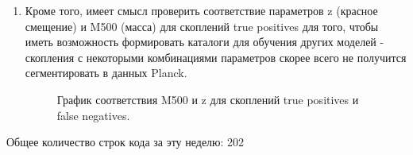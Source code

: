 \documentclass{article}
\begin{document}
\begin{enumerate}
    \item Кроме того, имеет смысл проверить соответствие параметров z (красное смещение) и M500 
        (масса) для скоплений true positives для того, чтобы иметь возможность формировать каталоги 
        для обучения других моделей - скопления с некоторыми комбинациями параметров скорее всего не 
        получится сегментировать в данных Planck.\\

    \begin{figure}[h]
        \caption{График соответствия M500 и z для скоплений true positives и false negatives.}
    \end{figure}

\end{enumerate}

Общее количество строк кода за эту неделю: 202\\
\end{document}
